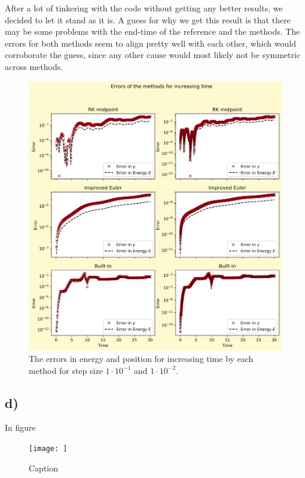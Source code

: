 \documentclass[12pt, a4paper,usenames,dvipsnames]{article}
\begin{document}
After a lot of tinkering with the code without getting any better results, we decided to let it stand as it is. A guess for why we get this result is that there may be some problems with the end-time of the reference and the methods. The errors for both methods seem to align pretty well with each other, which would corroborate the guess, since any other cause would most likely not be symmetric across methods.


\thispagestyle{plain}
\begin{figure}[h!]
    \centering
    \includegraphics[width=\linewidth]{Graphs2d.png}
    \caption{The errors in energy and position for increasing time by each method for step size \(1\cdot10^{-1}\) and \(1\cdot10^{-2}\).}
    \label{fig:gr2d}
\end{figure}
\restoregeometry
\subsection*{d)}
In figure
\begin{figure}
    \centering
    \texttt{[image: ]}
    \caption{Caption}
    \label{fig:my_label}
\end{figure}
\end{document}
